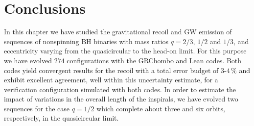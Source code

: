 \section{Conclusions}
\label{bhkick:sec:concl}
%
In this chapter we have studied the gravitational recoil and GW emission
of sequences of nonspinning BH binaries with mass ratios $q=2/3$,
$1/2$ and $1/3$,
and eccentricity varying from the quasicircular to the head-on limit.
For this purpose we have evolved $274$ configurations
with the {\sc GRChombo} and {\sc Lean} codes. Both codes yield
convergent results for the recoil with a total error budget of
$3$-$4\,\%$ and exhibit excellent agreement, well within this uncertainty
estimate, for a verification configuration simulated with both codes.
In order to estimate the impact of variations in the overall length
of the inspirals, we have evolved two sequences for the case $q=1/2$ which
complete about three and six orbits, respectively, in the quasicircular limit.

